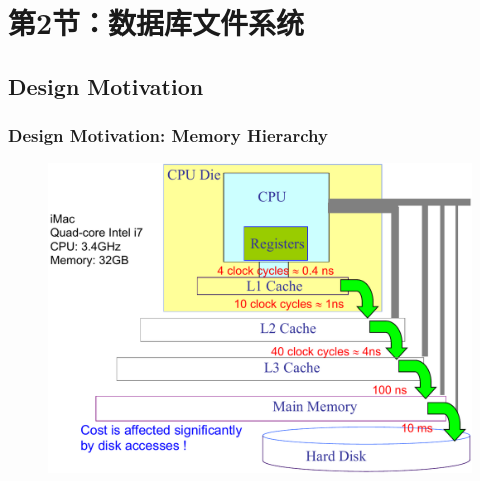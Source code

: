 \section{第2节：数据库文件系统} %
\subsection{Design Motivation} %

\begin{frame}[fragile]
    \frametitle{Design Motivation: Memory Hierarchy}
    \begin{figure}
        \includegraphics[width=0.6\linewidth]{figs/dbfile-mem-hierarchy.pdf}
    \end{figure}
\end{frame}

